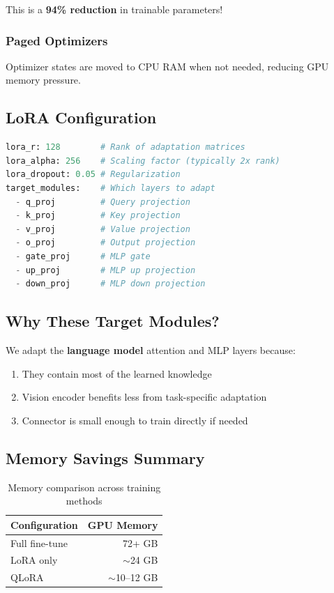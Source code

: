 \documentclass[11pt,a4paper]{article}
\begin{document}
This is a \textbf{94\% reduction} in trainable parameters!

\subsubsection{Paged Optimizers}
Optimizer states are moved to CPU RAM when not needed, reducing GPU memory pressure.

\subsection{LoRA Configuration}

\begin{lstlisting}[language=Python,caption=LoRA configuration]
lora_r: 128        # Rank of adaptation matrices
lora_alpha: 256    # Scaling factor (typically 2x rank)
lora_dropout: 0.05 # Regularization
target_modules:    # Which layers to adapt
  - q_proj         # Query projection
  - k_proj         # Key projection  
  - v_proj         # Value projection
  - o_proj         # Output projection
  - gate_proj      # MLP gate
  - up_proj        # MLP up projection
  - down_proj      # MLP down projection
\end{lstlisting}

\subsection{Why These Target Modules?}

We adapt the \textbf{language model} attention and MLP layers because:
\begin{enumerate}
    \item They contain most of the learned knowledge
    \item Vision encoder benefits less from task-specific adaptation
    \item Connector is small enough to train directly if needed
\end{enumerate}

\subsection{Memory Savings Summary}

\begin{table}[H]
\centering
\begin{tabular}{@{}lr@{}}
\toprule
\textbf{Configuration} & \textbf{GPU Memory} \\
\midrule
Full fine-tune & 72+ GB \\
LoRA only & $\sim$24 GB \\
QLoRA & $\sim$10--12 GB \\
\bottomrule
\end{tabular}
\caption{Memory comparison across training methods}
\end{table}
\end{document}
